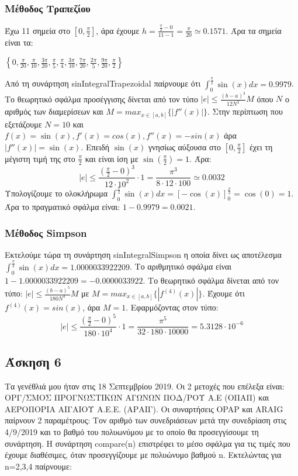 \documentclass[12pt,a4paper]{article}
\begin{document}
\subsubsection*{Μέθοδος Τραπεζίου}
Έχω 11 σημεία στο $[0,\frac{\pi}{2}]$, άρα έχουμε $h=\frac{\frac{\pi}{2} - 0}{11-1}=\frac{\pi}{20}\simeq 0.1571$. Άρα τα σημεία είναι τα:
\begin{center}
    $\left\{0,\frac{\pi }{20},\frac{\pi }{10},\frac{3 \pi }{20},
    \frac{\pi }{5},\frac{\pi }{4},\frac{3 \pi }{10},\frac{7 \pi }{20},\frac{2 \pi }{5},\frac{9 \pi }{20},\frac{\pi }{2}\right\}$
\end{center}
Από τη συνάρτηση sinIntegralTrapezoidal παίρνουμε ότι $\int_0^{\frac{\pi}{2}}\sin(x)dx = 0.9979$. Το θεωρητικό σφάλμα προσέγγισης 
δίνεται από τον τύπο $\left| e \right| \leq \frac{(b-a)^3}{12N^2}M$ όπου $N$ ο αριθμός των διαμερίσεων και $M = max_{x\in[a,b]}\{ \left| f''(x) \right| \}$.
Στην περίπτωση που εξετάζουμε $N=10$ και $f(x) = \sin(x), f'(x) = cos(x), f''(x) = -sin(x)$ άρα $\left| f''(x) \right| = \sin(x)$. Επειδή $\sin(x)$ γνησίως 
αύξουσα στο $[0,\frac{\pi}{2}]$ έχει τη μέγιστη τιμή της στο $\frac{\pi}{2}$ και είναι ίση με $\sin(\frac{\pi}{2}) = 1$. Άρα:
\begin{equation*}
    \left| e \right| \leq \frac{(\frac{\pi}{2}-0)^3}{12 \cdot 10^2}\cdot 1 = \frac{\pi^3}{8\cdot 12\cdot 100} \simeq 0.0032
\end{equation*}
Υπολογίζουμε το ολοκλήρωμα $\int_0^{\frac{\pi}{2}}\sin(x)dx = \left[ -\cos(x) \right]_0^{\frac{\pi}{2}} = \cos(0) = 1$. Άρα το πραγματικό σφάλμα είναι: 
$1 - 0.9979 = 0.0021$.
\subsubsection*{Μέθοδος Simpson}
Εκτελούμε τώρα τη συνάρτηση sinIntegralSimpson η οποία δίνει ως αποτέλεσμα $\int_0^{\frac{\pi}{2}}\sin(x)dx = 1.0000033922209$. Το αριθμητικό σφάλμα είναι 
$1-1.0000033922209= -0.0000033922$. Το θεωρητικό σφάλμα δίνεται από τον τύπο: $\left| e \right| \leq \frac{(b-a)^5}{180N^4}M$ με $M=max_{x\in[a,b]}\{ \left| f^{(4)}(x) \right| \}$. 
Έχουμε ότι $f^{(4)}(x) = sin(x)$, άρα $M=1$. Εφαρμόζοντας στον τύπο:
\begin{equation*}
    \left| e \right| \leq \frac{(\frac{\pi}{2}-0)^5}{180\cdot 10^4}\cdot 1 = \frac{\pi^5}{32 \cdot 180 \cdot 10000} = 5.3128\cdot 10^{-6}
\end{equation*}

\subsection*{Άσκηση 6}
Τα γενέθλιά μου ήταν στις 18 Σεπτεμβρίου 2019. Οι 2 μετοχές που επέλεξα είναι: ΟΡΓ/ΣΜΟΣ ΠΡΟΓΝΩΣΤΙΚΩΝ ΑΓΩΝΩΝ ΠΟΔ/ΡΟΥ Α.Ε (ΟΠΑΠ) και 
ΑΕΡΟΠΟΡΙΑ ΑΙΓΑΙΟΥ Α.Ε.Ε. (ΑΡΑΙΓ). Οι συναρτήσεις OPAP και ARAIG παίρνουν 2 παραμέτρους: Τον αριθμό των συνεδριάσεων μετά την συνεδρίαση στις 
4/9/2019 και το βαθμό του πολυωνύμου με το οποίο θα προσεγγίσουμε τη συνάρτηση. Η συνάρτηση compare(n) επιστρέφει το μέσο σφάλμα για τις τιμές που 
έχουμε διαθέσιμες, όταν προσεγγίζουμε με πολυώνυμο βαθμού n. Εκτελώντας για n=2,3,4 παίρνουμε:
\end{document}
